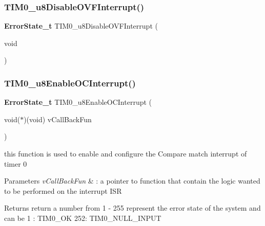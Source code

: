 \mbox{\label{_t_i_m_e_r0_8c_a9f9bfc11592c6c1f4770263b79162ee3}} 
\subsubsection{T\+I\+M0\+\_\+u8\+Disable\+O\+V\+F\+Interrupt()}
{\footnotesize\ttfamily \textbf{ Error\+State\+\_\+t} T\+I\+M0\+\_\+u8\+Disable\+O\+V\+F\+Interrupt (\begin{DoxyParamCaption}\item[{void}]{ }\end{DoxyParamCaption})}

\mbox{\label{_t_i_m_e_r0_8c_a80bbcb7217a1f9389e1f73d39b3b04d3}} 
\subsubsection{T\+I\+M0\+\_\+u8\+Enable\+O\+C\+Interrupt()}
{\footnotesize\ttfamily \textbf{ Error\+State\+\_\+t} T\+I\+M0\+\_\+u8\+Enable\+O\+C\+Interrupt (\begin{DoxyParamCaption}\item[{void($\ast$)(void)}]{v\+Call\+Back\+Fun }\end{DoxyParamCaption})}



this function is used to enable and configure the Compare match interrupt of timer 0 


\begin{DoxyParams}{Parameters}
{\em v\+Call\+Back\+Fun} & \+: a pointer to function that contain the logic wanted to be performed on the interrupt I\+SR \\
\hline
\end{DoxyParams}
\begin{DoxyReturn}{Returns}
return a number from 1 -\/ 255 represent the error state of the system and can be 1 \+: T\+I\+M0\+\_\+\+OK 252\+: T\+I\+M0\+\_\+\+N\+U\+L\+L\+\_\+\+I\+N\+P\+UT 
\end{DoxyReturn}
\mbox{\label{_t_i_m_e_r0_8c_a1d94b9fccfdcbb336ed7f975cc947730}} 
